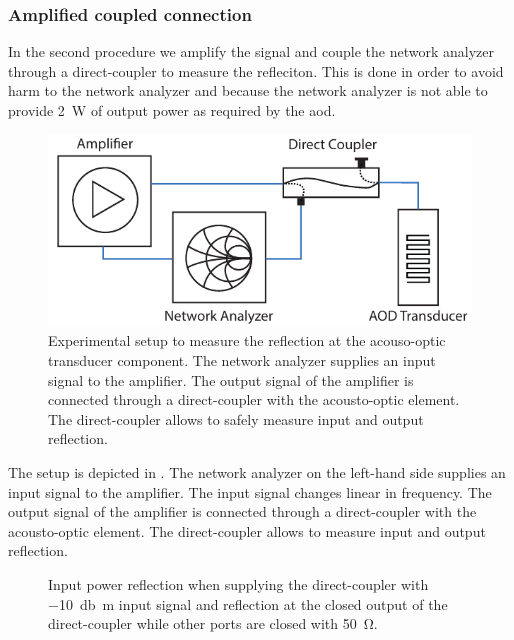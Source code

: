 \subsubsection{Amplified coupled connection}

In the second procedure we amplify the signal and couple the network analyzer
through a direct-coupler to measure the refleciton. This is done in order to
avoid harm to the network analyzer and because the network analyzer is not
able to provide \SI{2}{\watt} of output power as required by the \gls{aod}.
\begin{figure}[htb]
  \centering
  \includegraphics[width=.8\textwidth]{../figure/signal/setup-transducer.pdf}
  \caption{Experimental setup to measure the reflection at the acouso-optic
  transducer component. The network analyzer supplies an input signal to
  the amplifier. The output signal of the amplifier is connected through
  a direct-coupler with the acousto-optic element. The direct-coupler allows
  to safely measure input and output reflection.
  }\label{fig:signal_amplification_transducer_setup}
\end{figure}
The setup is depicted in .
The network analyzer on the left-hand side supplies an input signal to the
amplifier. The input signal changes linear in frequency. The output signal
of the amplifier is connected through a direct-coupler with the acousto-optic
element. The direct-coupler allows to measure input and output reflection.
\begin{figure}[htb]
  \centering
  \begin{adjustbox}{width=\textwidth}
    
  \end{adjustbox}
  \caption{Input power reflection when supplying the direct-coupler with
    \SI{-10}{\decibel\meter} input signal and reflection at the closed output
    of the direct-coupler while other ports are closed with \SI{50}{\ohm}.
  }\label{fig:signal_reflection_coupler}
\end{figure}
